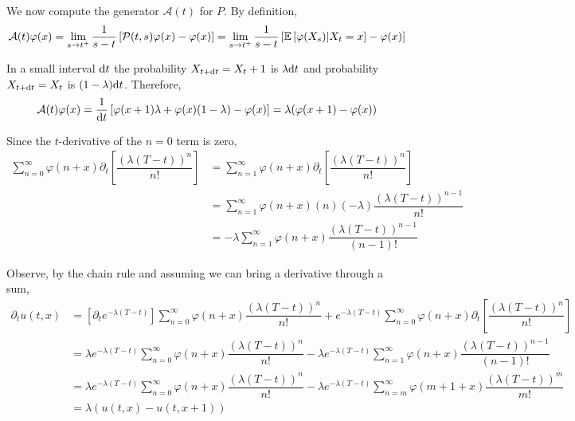 \documentclass[10pt]{article}
\begin{document}
\begin{solution}[Solution]
\begin{enumerate}[label=(\alph*)]
        We now compute the generator \( \mathcal{A} (t) \) for \( P \). By definition,
        \begin{align*}
            \mathcal{A} (t) \varphi(x) 
            = \lim_{s\to t^+} \dfrac{1}{s-t} \left[ \mathcal{P}(t,s) \varphi(x) - \varphi(x)  \right]
            = \lim_{s\to t^+} \dfrac{1}{s-t} \left[ \mathbb{E} \left[ \varphi(X_s) | X_t=x \right] - \varphi(x)  \right]
        \end{align*}
       
        In a small interval \( \mathrm{d} t \) the probability \( X_{t+\mathrm{d} t} = X_t + 1 \) is \( \lambda \mathrm{d} t \) and probability \( X_{t+\mathrm{d} t} = X_t \) is \( (1-\lambda)\mathrm{d} t \). Therefore,
        \begin{align*}
            \mathcal{A} (t) \varphi(x) = \dfrac{1}{\mathrm{d} t} \left[\varphi(x+1) \lambda + \varphi(x) (1-\lambda) - \varphi(x) \right]
            = \lambda(\varphi(x+1) - \varphi(x))
        \end{align*}
        
    
        Since the \( t \)-derivative of the \( n=0 \) term is zero,
        \begin{align*}
            \sum_{n=0}^{\infty} \varphi(n+x) \partial_t \left[ \dfrac{(\lambda(T-t))^n}{n!} \right]
            &= \sum_{n=1}^{\infty} \varphi(n+x) \partial_t \left[ \dfrac{(\lambda(T-t))^n}{n!} \right]
            \\&= \sum_{n=1}^{\infty} \varphi(n+x) (n)(-\lambda)\dfrac{(\lambda(T-t))^{n-1}}{n!}
            \\&= -\lambda\sum_{n=1}^{\infty} \varphi(n+x) \dfrac{(\lambda(T-t))^{n-1}}{(n-1)!}
        \end{align*}
        
        Observe, by the chain rule and assuming we can bring a derivative through a sum,
        \begin{align*}
            \partial_t u(t,x) 
            &= \left[ \partial_t e^{-\lambda(T-t)} \right] \sum_{n=0}^{\infty} \varphi(n+x) \dfrac{(\lambda(T-t))^n}{n!} 
            + e^{-\lambda(T-t)} \sum_{n=0}^{\infty} \varphi(n+x) \partial_t \left[ \dfrac{(\lambda(T-t))^n}{n!} \right]
            \\&= \lambda e^{-\lambda(T-t)} \sum_{n=0}^{\infty} \varphi(n+x) \dfrac{(\lambda(T-t))^n}{n!} 
            - \lambda e^{-\lambda(T-t)} \sum_{n=1}^{\infty} \varphi(n+x) \dfrac{(\lambda(T-t))^{n-1}}{(n-1)!} 
            \\&= \lambda e^{-\lambda(T-t)} \sum_{n=0}^{\infty} \varphi(n+x) \dfrac{(\lambda(T-t))^n}{n!} 
            - \lambda e^{-\lambda(T-t)} \sum_{n=m}^{\infty} \varphi(m+1+x) \dfrac{(\lambda(T-t))^{m}}{m!}
            \\&= \lambda(u(t,x) - u(t,x+1))
        \end{align*}
        

\end{enumerate}
\end{solution}
\end{document}
